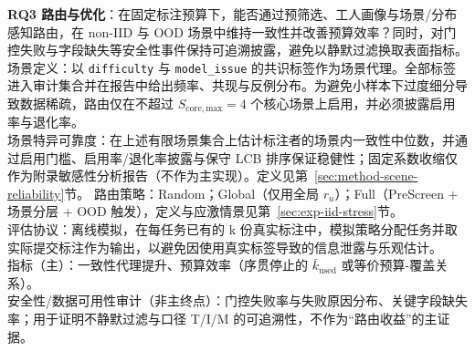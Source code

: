 \textbf{RQ3 路由与优化}：在固定标注预算下，能否通过预筛选、工人画像与场景/分布感知路由，在 non-IID 与 OOD 场景中维持一致性并改善预算效率？同时，对门控失败与字段缺失等安全性事件保持可追溯披露，避免以静默过滤换取表面指标。
\\ 场景定义：以 \texttt{difficulty} 与 \texttt{model\_issue} 的共识标签作为场景代理。全部标签进入审计集合并在报告中给出频率、共现与反例分布。为避免小样本下过度细分导致数据稀疏，路由仅在不超过 $S_{\mathrm{core,max}}=4$ 个核心场景上启用，并必须披露启用率与退化率。
\\ 场景特异可靠度：在上述有限场景集合上估计标注者的场景内一致性中位数，并通过启用门槛、启用率/退化率披露与保守 LCB 排序保证稳健性；固定系数收缩仅作为附录敏感性分析报告（不作为主实现）。定义见第~\ref{sec:method-scene-reliability}节。
路由策略：Random；Global（仅用全局 $r_u$）；Full（PreScreen + 场景分层 + OOD 触发），定义与应激情景见第~\ref{sec:exp-iid-stress}节。
\\ 评估协议：离线模拟，在每任务已有的 k 份真实标注中，模拟策略分配任务并取实际提交标注作为输出，以避免因使用真实标签导致的信息泄露与乐观估计。
\\ 指标（主）：一致性代理提升、预算效率（序贯停止的 $\bar{k}_{\mathrm{used}}$ 或等价预算-覆盖关系）。
\\ 安全性/数据可用性审计（非主终点）：门控失败率与失败原因分布、关键字段缺失率；用于证明不静默过滤与口径 T/I/M 的可追溯性，不作为“路由收益”的主证据。


